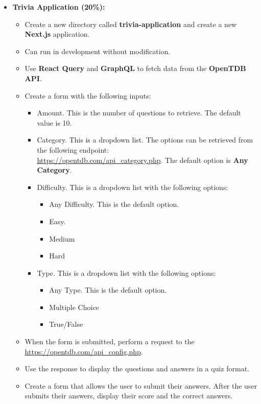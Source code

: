 \documentclass{article}
\begin{document}
	\begin{itemize}
	\item \textbf{Trivia Application (20\%):}
	\begin{itemize}
		\item Create a new directory called \textbf{trivia-application} and create a new \textbf{Next.js} application.
		\item Can run in development without modification.
		\item Use \textbf{React Query} and \textbf{GraphQL} to fetch data from the \textbf{OpenTDB API}.
		\item Create a form with the following inputs:
		\begin{itemize}
			\item Amount. This is the number of questions to retrieve. The default value is 10.
			\item Category. This is a dropdown list. The options can be retrieved from the following endpoint:\\
			\href{https://opentdb.com/api\_category.php}{https://opentdb.com/api\_category.php}. The default option is \textbf{Any Category}.			
			\item Difficulty. This is a dropdown list with the following options:
			\begin{itemize}
				\item Any Difficulty. This is the default option.
				\item Easy. 
				\item Medium
				\item Hard
			\end{itemize}
			\item Type. This is a dropdown list with the following options:
			\begin{itemize}
				\item Any Type. This is the default option.
				\item Multiple Choice
				\item True/False
			\end{itemize}
		\end{itemize}
		\item When the form is submitted, perform a request to the \href{OpenTDB API}{https://opentdb.com/api\_config.php}. 
		\item Use the response to display the questions and answers in a quiz format. 
		\item Create a form that allows the user to submit their answers. After the user submits their answers, display their score and the correct answers.
	\end{itemize} 
\end{itemize}
\end{document}
